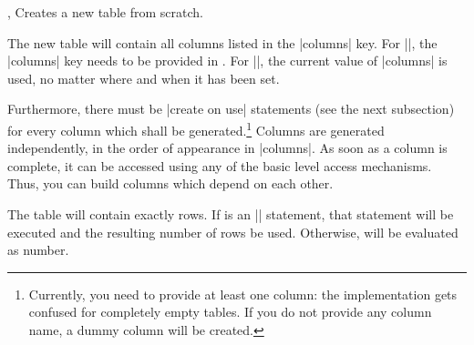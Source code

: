\documentclass[a4paper]{ltxdoc}
\begin{document}
\begin{commandlist}{%
    \pgfplotstablenew{},
    \pgfplotstablenew*{}%
}
    Creates a new table from scratch.

    The new table will contain all columns listed in the |columns| key. For
    |\pgfplotstablenew|, the |columns| key needs to be provided in
    . For |\pgfplotstablenew*|, the current value of |columns| is
    used, no matter where and when it has been set.

    Furthermore, there must be |create on use| statements (see the next
    subsection) for every column which shall be generated.\footnote{Currently,
    you need to provide at least one column: the implementation gets confused
    for completely empty tables. If you do not provide any column name, a dummy
    column will be created.} Columns are generated independently, in the order
    of appearance in |columns|. As soon as a column is complete, it can be
    accessed using any of the basic level access mechanisms. Thus, you can
    build columns which depend on each other.

    The table will contain exactly  rows. If 
    is an |\pgfplotstablegetrowsof| statement, that statement will be executed
    and the resulting number of rows be  used. Otherwise,  will
    be evaluated as number.
\begin{codeexample}[]
\loadedtable
\pgfplotstabletypeset[empty cells with={---}]\loadedtable
\end{codeexample}

\begin{codeexample}[]
    \loadedtable
\pgfplotstabletypeset\loadedtable
\end{codeexample}
\end{commandlist}
\end{document}
